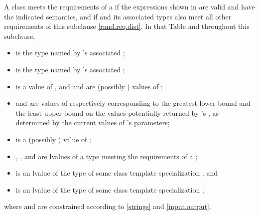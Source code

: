 \pnum
A class 
meets the requirements
of a 
if the expressions shown
in 
are valid and have the indicated semantics,
and if  and its associated types
also meet all other requirements
of this subclause \ref{rand.req.dist}.
In that Table and throughout this subclause,
\begin{itemize}
  \item
     is the type named by
    's associated ;
  \item
     is the type named by
    's associated ;
  \item
     is a
    value of ,
    and
     and  are (possibly ) values of ;
  \item
     and 
    are values of 
    respectively corresponding to
    the greatest lower bound and the least upper bound
    on the values potentially returned by 's ,
    as determined by the current values of 's parameters;
  \item
     is a (possibly ) value of ;
  \item
    , , and  are lvalues of a type
    meeting the requirements
    of a ;
  \item
     is an lvalue of the type of some class template specialization
     ;
  and
  \item
     is an lvalue of the type of some class template specialization
     ;
\end{itemize}
where  and  are constrained
according to \ref{strings} and \ref{input.output}.

